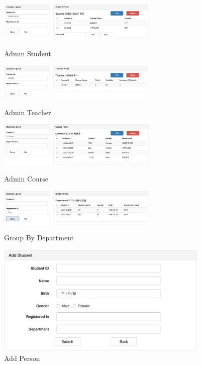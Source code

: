 \documentclass[a4paper, 11pt, nofonts, nocap, fancyhdr]{ctexart}
\begin{document}
	\begin{figure}[h]
		\begin{minipage}{0.5\textwidth}
			\centering
			\includegraphics[width=3in]{adstu}
			\caption{Admin Student}
		\end{minipage}%
		\begin{minipage}{0.5\textwidth}
			\centering
			\includegraphics[width=3in]{adtea}
			\caption{Admin Teacher}
		\end{minipage}

		\begin{minipage}{0.5\textwidth}
			\centering
			\includegraphics[width=3in]{adcou}
			\caption{Admin Course}
		\end{minipage}%
		\begin{minipage}{0.5\textwidth}
			\centering
			\includegraphics[width=3in]{addep}
			\caption{Group By Department}
		\end{minipage}

		\centering
		\includegraphics[width=4in]{adadd}
		\caption{Add Person}
	\end{figure}
\end{document}
